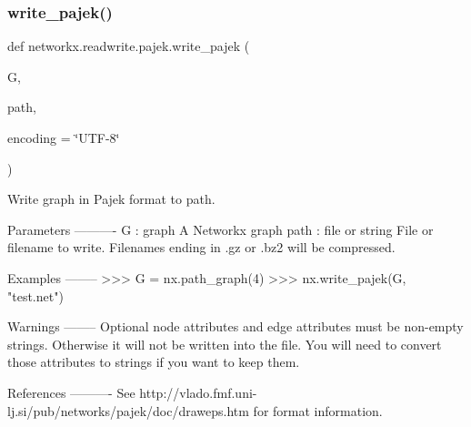 \subsubsection{\texorpdfstring{write\+\_\+pajek()}{write\_pajek()}}
{\footnotesize\ttfamily def networkx.\+readwrite.\+pajek.\+write\+\_\+pajek (\begin{DoxyParamCaption}\item[{}]{G,  }\item[{}]{path,  }\item[{}]{encoding = {\ttfamily \char`\"{}UTF-\/8\char`\"{}} }\end{DoxyParamCaption})}

\begin{DoxyVerb}Write graph in Pajek format to path.

Parameters
----------
G : graph
   A Networkx graph
path : file or string
   File or filename to write.
   Filenames ending in .gz or .bz2 will be compressed.

Examples
--------
>>> G = nx.path_graph(4)
>>> nx.write_pajek(G, "test.net")

Warnings
--------
Optional node attributes and edge attributes must be non-empty strings.
Otherwise it will not be written into the file. You will need to
convert those attributes to strings if you want to keep them.

References
----------
See http://vlado.fmf.uni-lj.si/pub/networks/pajek/doc/draweps.htm
for format information.
\end{DoxyVerb}
 